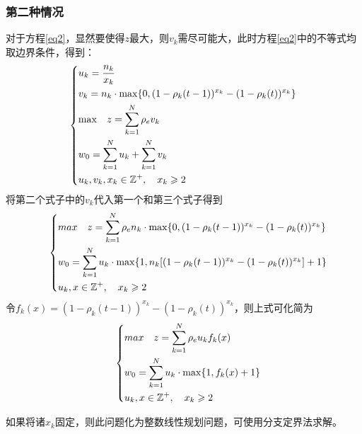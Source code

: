 \documentclass[withoutpreface,bwprint]{cumcmthesis} %
\begin{document}
\subsubsection{第二种情况}
对于方程\ref{eq2}，显然要使得$z$最大，则$v_k$需尽可能大，此时方程\ref{eq2}中的不等式均取边界条件，得到：
\begin{align}
\label{eq2solution1}
    \left\{
    \begin{aligned}
        &u_k =\dfrac{n_k}{x_k} \\
        &v_k =n_k \cdot {\rm max}
         \{0,(1-\rho_k(t-1))^{x_k}-(1-\rho_k(t))^{x_k} \} \\
        &{\rm max} \quad z = \sum^N_{k=1}\rho_e v_k  \\
        &w_0 =\sum^N_{k=1} u_k +\sum^N_{k=1} v_k  \\
        &u_k,v_k,x_k\in\mathbb{Z^+},\quad  x_k \geqslant 2  \\
    \end{aligned}
    \right.
\end{align}
将第二个式子中的$v_k$代入第一个和第三个式子得到
\begin{align}
\label{eq2solution1}
\quad\left\{
    \begin{aligned}
        &max\quad z = \sum^N_{k=1}\rho_e n_k \cdot {\rm max}
         \{0,(1-\rho_k(t-1))^{x_k} - (1-\rho_k(t))^{x_k} \}   \\
        &w_0 = \sum^N_{k=1} u_k\cdot {\rm max} \{1, n_k  [(1-\rho_k(t-1))^{x_k}-(1-\rho_k(t))^{x_k}] +1 \} \\
        &u_k,x\in\mathbb{Z^+}, \quad x_k \geqslant 2 \\
    \end{aligned}
    \right.
\end{align}
令$f_k(x) = (1-\rho_k(t-1))^{x_k}-(1-\rho_k(t))^{x_k}$，则上式可化简为
\begin{align}
\label{eq2solution1}
\quad\left\{
    \begin{aligned}
        &max\quad z = \sum^N_{k=1}\rho_e u_k f_k(x)  \\
        &w_0 = \sum^N_{k=1} u_k \cdot {\rm max}\{1,f_k(x)+1\}  \\
        &u_k,x\in\mathbb{Z^+},  \quad x_k \geqslant 2 \\
    \end{aligned}
    \right.
\end{align}

如果将诸$x_k$固定，则此问题化为整数线性规划问题，可使用分支定界法求解\cite{bib20}。
\end{document}
